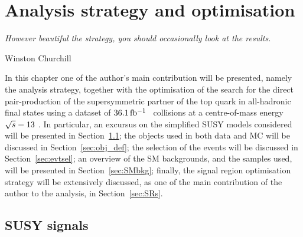 \chapter{Analysis strategy and optimisation}
\label{ch:stop_ana}
\epigraph{\emph{However beautiful the strategy, you should occasionally look at the results.}}{Winston Churchill}

	In this chapter one of the author's main contribution will be presented, namely the analysis strategy, together with the optimisation of the search for the direct pair-production of the supersymmetric partner of the top quark in all-hadronic final states using a dataset of $36.1\, \mbox{fb$^{-1}$}$ \pp\ collisions at a centre-of-mass energy $\sqrt{s} = 13$ \TeV. In particular, an excursus on the simplified \ac{SUSY} models considered will be presented in Section~\ref{sec:susysig}; the objects used in both data and \ac{MC} will be discussed in Section~\ref{sec:obj_def}; the selection of the events will be discussed in Section~\ref{sec:evtsel}; an overview of the \ac{SM} backgrounds, and the samples used, will be presented in Section~\ref{sec:SMbkg}; finally, the signal region optimisation strategy will be extensively discussed, as one of the main contribution of the author to the analysis, in Section~\ref{sec:SRs}. 




	\section{SUSY signals}
	\label{sec:susysig}


